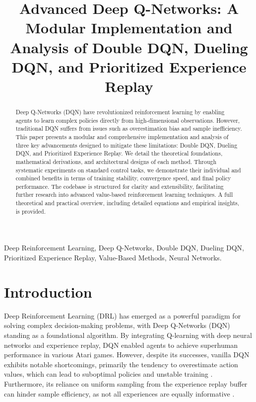 \documentclass[conference]{IEEEtran}
\begin{document}
\title{Advanced Deep Q-Networks: A Modular Implementation and Analysis of Double DQN, Dueling DQN, and Prioritized Experience Replay}

\author{
}

\maketitle

\begin{abstract}
Deep Q-Networks (DQN) have revolutionized reinforcement learning by enabling agents to learn complex policies directly from high-dimensional observations. However, traditional DQN suffers from issues such as overestimation bias and sample inefficiency. This paper presents a modular and comprehensive implementation and analysis of three key advancements designed to mitigate these limitations: Double DQN, Dueling DQN, and Prioritized Experience Replay. We detail the theoretical foundations, mathematical derivations, and architectural designs of each method. Through systematic experiments on standard control tasks, we demonstrate their individual and combined benefits in terms of training stability, convergence speed, and final policy performance. The codebase is structured for clarity and extensibility, facilitating further research into advanced value-based reinforcement learning techniques. A full theoretical and practical overview, including detailed equations and empirical insights, is provided.
\end{abstract}

\begin{IEEEkeywords}
Deep Reinforcement Learning, Deep Q-Networks, Double DQN, Dueling DQN, Prioritized Experience Replay, Value-Based Methods, Neural Networks.
\end{IEEEkeywords}


\section{Introduction}
Deep Reinforcement Learning (DRL) has emerged as a powerful paradigm for solving complex decision-making problems, with Deep Q-Networks (DQN) \cite{mnih2015human} standing as a foundational algorithm. By integrating Q-learning with deep neural networks and experience replay, DQN enabled agents to achieve superhuman performance in various Atari games. However, despite its successes, vanilla DQN exhibits notable shortcomings, primarily the tendency to overestimate action values, which can lead to suboptimal policies and unstable training \cite{vanhasselt2016deep}. Furthermore, its reliance on uniform sampling from the experience replay buffer can hinder sample efficiency, as not all experiences are equally informative \cite{schaul2015prioritized}.
\end{document}

